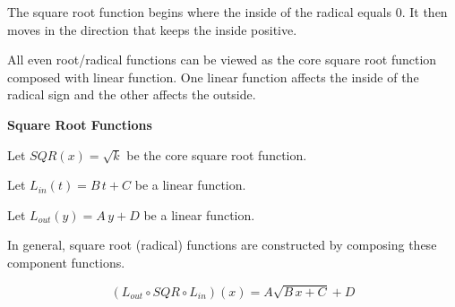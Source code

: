 \documentclass{ximera}
\begin{document}
\begin{image}
\end{image}



The square root function begins where the inside of the radical equals $0$.  It then moves in the direction that keeps the inside positive.


All even root/radical functions can be viewed as the core square root function composed with linear function. One linear function affects the inside of the radical sign and the other affects the outside.


\begin{idea} \textbf{\textcolor{blue!55!black}{Square Root Functions}} 


Let $SQR(x) = \sqrt{k}$ be the core square root function.

Let $L_{in}(t) = B \, t + C$ be a linear function.

Let $L_{out}(y) = A \, y + D$ be a linear function.


In general, square root (radical) functions are constructed by composing these component functions.


\[
(L_{out} \circ SQR \circ L_{in})(x) = A \sqrt{B \,x + C} + D
\]


\end{idea}
\end{document}
